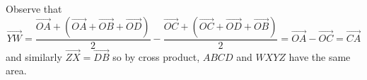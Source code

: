 Observe that \[\overrightarrow{YW}=\frac{\overrightarrow{OA}+\left(\overrightarrow{OA}+\overrightarrow{OB}+\overrightarrow{OD}\right)}{2}-\frac{\overrightarrow{OC}+\left(\overrightarrow{OC}+\overrightarrow{OD}+\overrightarrow{OB}\right)}{2}=\overrightarrow{OA}-\overrightarrow{OC}=\overrightarrow{CA}\] and similarly $\overrightarrow{ZX}=\overrightarrow{DB}$ so by cross product, $ABCD$ and $WXYZ$ have the same area.